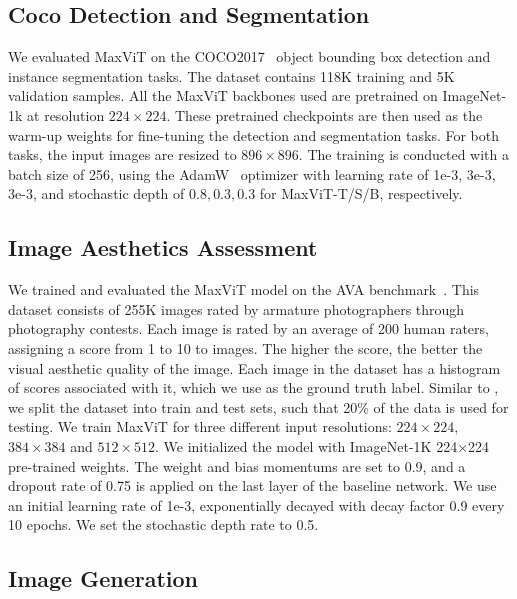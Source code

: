 \documentclass[runningheads]{llncs}
\begin{document}
\subsection{Coco Detection and Segmentation}
\label{ssec:coco-settings}
We evaluated MaxViT on the COCO2017~\cite{lin2014microsoft} object bounding box detection and instance segmentation tasks.
The dataset contains 118K training and 5K validation samples.
All the MaxViT backbones used are pretrained on ImageNet-1k at  resolution $224\times224$.
These pretrained checkpoints are then used as the warm-up weights for fine-tuning the detection and segmentation tasks.
For both tasks, the input images are resized to $896\times896$.
The training is conducted with a batch size of 256, using the AdamW~\cite{loshchilov2017decoupled} optimizer with learning rate of 1e-3, 3e-3, 3e-3, and stochastic depth of $0.8, 0.3, 0.3$ for MaxViT-T/S/B, respectively.


\subsection{Image Aesthetics Assessment}
\label{ssec:image-quality-settings}

We trained and evaluated the MaxViT model on the AVA benchmark~\cite{murray2012ava}. This dataset consists of 255K images rated by armature photographers through photography contests. Each image is rated by an average of 200 human raters, assigning a score from 1 to 10 to images. The higher the score, the better the visual aesthetic quality of the image. Each image in the dataset has a histogram of scores associated with it, which we use as the ground truth label. Similar to \cite{talebi2018nima,ke2021musiq}, we split the dataset into train and test sets, such that 20\% of the data is used for testing. We train MaxViT for three different input resolutions: $224 \times 224$, $384 \times 384$ and $512 \times 512$. We initialized the model with ImageNet-1K 224$\times$224 pre-trained weights. The weight and bias momentums
are set to 0.9, and a dropout rate of 0.75 is applied on the
last layer of the baseline network. We use an initial learning rate of 1e-3, exponentially decayed with decay factor 0.9 every 10 epochs. We set the stochastic depth rate to 0.5.



\subsection{Image Generation}
\label{ssec:gan-settings}
\end{document}
